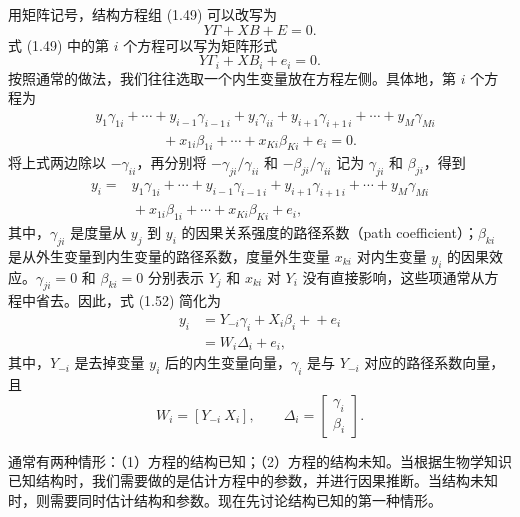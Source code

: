 用矩阵记号，结构方程组 (1.49) 可以改写为
\begin{equation}
 Y\Gamma+XB+E=0.
 \tag{1.50}
\end{equation}
式 (1.49) 中的第 $i$ 个方程可以写为矩阵形式
\begin{equation}
 Y\Gamma_i+XB_i+e_i=0.
 \tag{1.51}
\end{equation}
按照通常的做法，我们往往选取一个内生变量放在方程左侧。具体地，第 $i$ 个方程为
\[
 \begin{aligned}
 &y_1\gamma_{1i}+\cdots+y_{i-1}\gamma_{i-1\,i}+y_i\gamma_{ii}
  +y_{i+1}\gamma_{i+1\,i}+\cdots+y_M\gamma_{Mi}\\
 &\hspace{2cm}{}+x_{1i}\beta_{1i}+\cdots+x_{Ki}\beta_{Ki}+e_i=0.
 \end{aligned}
\]
将上式两边除以 $-\gamma_{ii}$，再分别将 $-\gamma_{ji}/\gamma_{ii}$ 和 $-\beta_{ji}/\gamma_{ii}$ 记为 $\gamma_{ji}$ 和 $\beta_{ji}$，得到
\begin{equation}
 \begin{aligned}
 y_i={}&y_1\gamma_{1i}+\cdots+y_{i-1}\gamma_{i-1\,i}
        +y_{i+1}\gamma_{i+1\,i}+\cdots+y_M\gamma_{Mi}\\
       &{}+x_{1i}\beta_{1i}+\cdots+x_{Ki}\beta_{Ki}+e_i,
 \end{aligned}
 \tag{1.52}
\end{equation}
其中，$\gamma_{ji}$ 是度量从 $y_j$ 到 $y_i$ 的因果关系强度的路径系数（path coefficient）；$\beta_{ki}$ 是从外生变量到内生变量的路径系数，度量外生变量 $x_{ki}$ 对内生变量 $y_i$ 的因果效应。$\gamma_{ji}=0$ 和 $\beta_{ki}=0$ 分别表示 $Y_j$ 和 $x_{ki}$ 对 $Y_i$ 没有直接影响，这些项通常从方程中省去。因此，式 (1.52) 简化为
\begin{equation}
 \begin{aligned}
 y_i&=Y_{-i}\gamma_i+X_i\beta_i+{}+e_i\\
    &=W_i\Delta_i+e_i,
 \end{aligned}
 \tag{1.53}
\end{equation}
其中，$Y_{-i}$ 是去掉变量 $y_i$ 后的内生变量向量，$\gamma_i$ 是与 $Y_{-i}$ 对应的路径系数向量，且
\[
 W_i=[Y_{-i}\ X_i],\qquad
 \Delta_i=\begin{bmatrix}\gamma_i\\\beta_i\end{bmatrix}.
\]

通常有两种情形：（1）方程的结构已知；（2）方程的结构未知。当根据生物学知识已知结构时，我们需要做的是估计方程中的参数，并进行因果推断。当结构未知时，则需要同时估计结构和参数。现在先讨论结构已知的第一种情形。

